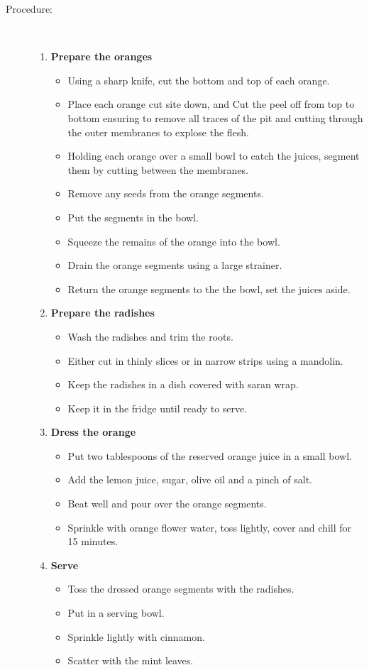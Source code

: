 \documentclass[11pt,letterpaper]{article}
\begin{document}
\begin{description}
\item[Procedure:]\ \\
	\begin{enumerate}
	\item {\bf Prepare the oranges}
	\begin{itemize}
	\item Using a sharp knife, cut the bottom and top of each orange.
	\item Place each orange cut site down, and Cut the peel off from top to bottom ensuring to remove all traces of the pit and cutting through the outer membranes to explose the flesh.
	\item Holding each orange over a small bowl to catch the juices, segment them by cutting between the membranes.
	\item Remove any seeds from the orange segments.
	\item Put the segments in the bowl.
	\item Squeeze the remains of the orange into the bowl.
	\item Drain the orange segments using a large strainer.
	\item Return the orange segments to the the bowl, set the juices aside. 
	\end{itemize}
	\item {\bf Prepare the radishes}
	\begin{itemize}
	\item Wash the radishes and trim the roots.
	\item Either cut in thinly slices or in narrow strips using a mandolin.
	\item Keep the radishes in a dish covered with saran wrap.
	\item Keep it in the fridge until ready to serve.
	\end{itemize}
	\item {\bf Dress the orange}
	\begin{itemize}
	\item Put two tablespoons of the reserved orange juice in a small bowl. 
	\item Add the lemon juice, sugar, olive oil and a pinch of salt.
	\item Beat well and pour over the orange segments.
	\item Sprinkle with orange flower water, toss lightly, cover and chill for 15 minutes.
	\end{itemize}
	\item {\bf Serve}
	\begin{itemize}
	\item Toss the dressed orange segments with the radishes.
	\item Put in a serving bowl.
	\item Sprinkle lightly with cinnamon.
	\item Scatter with the mint leaves.
	\end{itemize}
	\end{enumerate}
\end{description}
\end{document}

